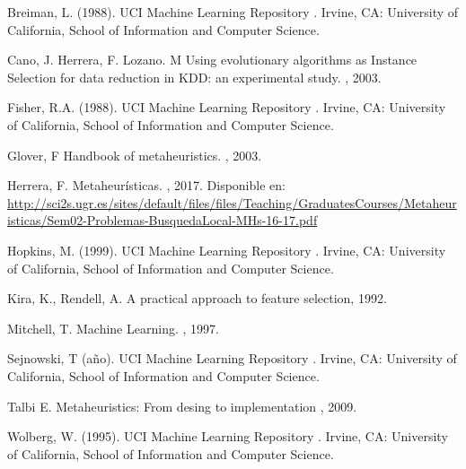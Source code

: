 \documentclass{ci5652}
\begin{document}
\begin{thebibliography}{99}

Breiman, L. (1988). UCI Machine Learning Repository 
.
\newblock Irvine, CA: University of California, School of Information and Computer Science.

Cano, J. Herrera, F. Lozano. M
\newblock Using evolutionary algorithms as Instance Selection for data
reduction in KDD: an experimental study.
, 2003.

Fisher, R.A. (1988). UCI Machine Learning Repository 
.
\newblock Irvine, CA: University of California, School of Information and Computer Science.

Glover, F
\newblock Handbook of metaheuristics. 
, 2003.

Herrera, F.
\newblock Metaheurísticas. 
, 2017. Disponible en: 
\url{http://sci2s.ugr.es/sites/default/files/files/Teaching/GraduatesCourses/Metaheuristicas/Sem02-Problemas-BusquedaLocal-MHs-16-17.pdf}

Hopkins, M. (1999). UCI Machine Learning Repository 
.
\newblock Irvine, CA: University of California, School of Information and Computer Science.

Kira, K., Rendell, A.
\newblock A practical approach to feature selection, 1992.

Mitchell, T.
\newblock Machine Learning.
, 1997.

Sejnowski, T (año). UCI Machine Learning Repository 
.
\newblock Irvine, CA: University of California, School of Information and Computer Science.

Talbi E.
\newblock Metaheuristics: From desing to implementation
, 2009.

Wolberg, W. (1995). UCI Machine Learning Repository 
.
\newblock Irvine, CA: University of California, School of Information and Computer Science.

%
\end{thebibliography}
\end{document}
